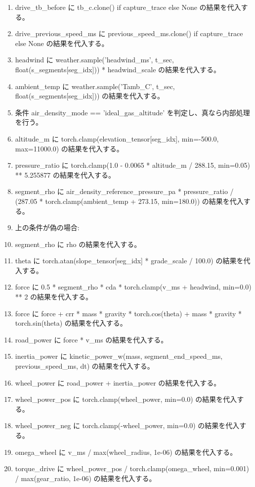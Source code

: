 \documentclass[a4paper,11pt]{article}
\begin{document}
\begin{enumerate}[leftmargin=1.8em]
\item   drive\_tb\_before に tb\_c.clone() if capture\_trace else None の結果を代入する。
\item   drive\_previous\_speed\_ms に previous\_speed\_ms.clone() if capture\_trace else None の結果を代入する。
\item   headwind に weather.sample('headwind\_ms', t\_sec, float(s\_segments[seg\_idx])) * headwind\_scale の結果を代入する。
\item   ambient\_temp に weather.sample('Tamb\_C', t\_sec, float(s\_segments[seg\_idx])) の結果を代入する。
\item   条件 air\_density\_mode == 'ideal\_gas\_altitude' を判定し、真なら内部処理を行う。
\item     altitude\_m に torch.clamp(elevation\_tensor[seg\_idx], min=-500.0, max=11000.0) の結果を代入する。
\item     pressure\_ratio に torch.clamp(1.0 - 0.0065 * altitude\_m / 288.15, min=0.05) ** 5.255877 の結果を代入する。
\item     segment\_rho に air\_density\_reference\_pressure\_pa * pressure\_ratio / (287.05 * torch.clamp(ambient\_temp + 273.15, min=180.0)) の結果を代入する。
\item     上の条件が偽の場合:
\item     segment\_rho に rho の結果を代入する。
\item   theta に torch.atan(slope\_tensor[seg\_idx] * grade\_scale / 100.0) の結果を代入する。
\item   force に 0.5 * segment\_rho * cda * torch.clamp(v\_ms + headwind, min=0.0) ** 2 の結果を代入する。
\item   force に force + crr * mass * gravity * torch.cos(theta) + mass * gravity * torch.sin(theta) の結果を代入する。
\item   road\_power に force * v\_ms の結果を代入する。
\item   inertia\_power に kinetic\_power\_w(mass, segment\_end\_speed\_ms, previous\_speed\_ms, dt) の結果を代入する。
\item   wheel\_power に road\_power + inertia\_power の結果を代入する。
\item   wheel\_power\_pos に torch.clamp(wheel\_power, min=0.0) の結果を代入する。
\item   wheel\_power\_neg に torch.clamp(-wheel\_power, min=0.0) の結果を代入する。
\item   omega\_wheel に v\_ms / max(wheel\_radius, 1e-06) の結果を代入する。
\item   torque\_drive に wheel\_power\_pos / torch.clamp(omega\_wheel, min=0.001) / max(gear\_ratio, 1e-06) の結果を代入する。

\end{enumerate}
\end{document}
